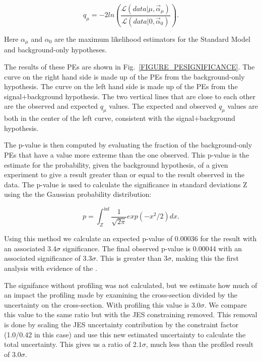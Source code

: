 \begin{equation}
q_{\mu}=-2ln\left(\frac{\mathcal{L}(data|\mu,\vec{\alpha}_{\mu})}{\mathcal{L}(data|0,\vec{\alpha}_{0})}\right).
\end{equation}

\noindent
Here $\alpha_{\mu}$ and $\alpha_0$ are the maximum likelihood estimators for the Standard Model and background-only hypotheses. 

The results of these PEs are shown in Fig.~\ref{FIGURE_PESIGNIFICANCE}. The curve on the right hand side is made up of the PEs from the background-only hypothesis. The curve on the left hand side is made up of the PEs from the signal+background hypothesis. The two vertical lines that are close to each other are the observed and expected $q_{\mu}$ values. The expected and observed $q_{\mu}$ values are both in the center of the left curve, consistent with the signal+background hypothesis. 

The p-value is then computed by evaluating the fraction of the background-only PEs that have a value more extreme than the one observed. This p-value is the estimate for the probability, given the background hypothesis, of a given experiment to give a result greater than or equal to the result observed in the data. The p-value is used to calculate the significance in standard deviations Z using the the Gaussian probability distribution:

\begin{equation}
p=\int_{Z}^{\inf}\frac{1}{\sqrt{2\pi}}exp(-x^2/2)dx.
\end{equation}

\noindent
Using this method we calculate an expected p-value of 0.00036 for the result with an associated 3.4$\sigma$ significance. The final observed p-value is 0.00044 with an associated significance of 3.3$\sigma$. This is greater than 3$\sigma$, making this the first analysis with evidence of the \Wtchan. 

The signifance without profiling was not calculated, but we estimate how much of an impact the profiling made by examining the cross-section divided by the uncertainty on the cross-section. With profiling this value is $3.0\sigma$. We compare this value to the same ratio but with the JES constraining removed. This removal is done by scaling the JES uncertainty contribution by the constraint factor (1.0/0.42 in this case) and use this new estimated uncertainty to calculate the total uncertainty. This gives us a ratio of $2.1\sigma$, much less than the profiled result of $3.0\sigma$.

